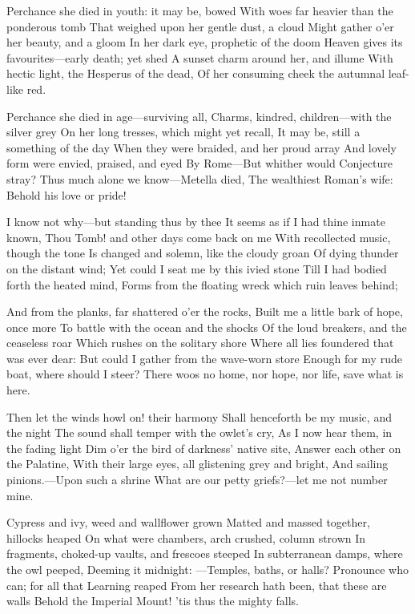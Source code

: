 \documentclass[10pt,twocolumn]{book}
\begin{document}
   Perchance she died in youth:  it may be, bowed
   With woes far heavier than the ponderous tomb
   That weighed upon her gentle dust, a cloud
   Might gather o'er her beauty, and a gloom
   In her dark eye, prophetic of the doom
   Heaven gives its favourites---early death; yet shed
   A sunset charm around her, and illume
   With hectic light, the Hesperus of the dead,
Of her consuming cheek the autumnal leaf-like red.


   Perchance she died in age---surviving all,
   Charms, kindred, children---with the silver grey
   On her long tresses, which might yet recall,
   It may be, still a something of the day
   When they were braided, and her proud array
   And lovely form were envied, praised, and eyed
   By Rome---But whither would Conjecture stray?
   Thus much alone we know---Metella died,
The wealthiest Roman's wife:  Behold his love or pride!


   I know not why---but standing thus by thee
   It seems as if I had thine inmate known,
   Thou Tomb! and other days come back on me
   With recollected music, though the tone
   Is changed and solemn, like the cloudy groan
   Of dying thunder on the distant wind;
   Yet could I seat me by this ivied stone
   Till I had bodied forth the heated mind,
Forms from the floating wreck which ruin leaves behind;


   And from the planks, far shattered o'er the rocks,
   Built me a little bark of hope, once more
   To battle with the ocean and the shocks
   Of the loud breakers, and the ceaseless roar
   Which rushes on the solitary shore
   Where all lies foundered that was ever dear:
   But could I gather from the wave-worn store
   Enough for my rude boat, where should I steer?
There woos no home, nor hope, nor life, save what is here.


   Then let the winds howl on! their harmony
   Shall henceforth be my music, and the night
   The sound shall temper with the owlet's cry,
   As I now hear them, in the fading light
   Dim o'er the bird of darkness' native site,
   Answer each other on the Palatine,
   With their large eyes, all glistening grey and bright,
   And sailing pinions.---Upon such a shrine
What are our petty griefs?---let me not number mine.


   Cypress and ivy, weed and wallflower grown
   Matted and massed together, hillocks heaped
   On what were chambers, arch crushed, column strown
   In fragments, choked-up vaults, and frescoes steeped
   In subterranean damps, where the owl peeped,
   Deeming it midnight: ---Temples, baths, or halls?
   Pronounce who can; for all that Learning reaped
   From her research hath been, that these are walls\textemdash
Behold the Imperial Mount! 'tis thus the mighty falls.
\end{document}
